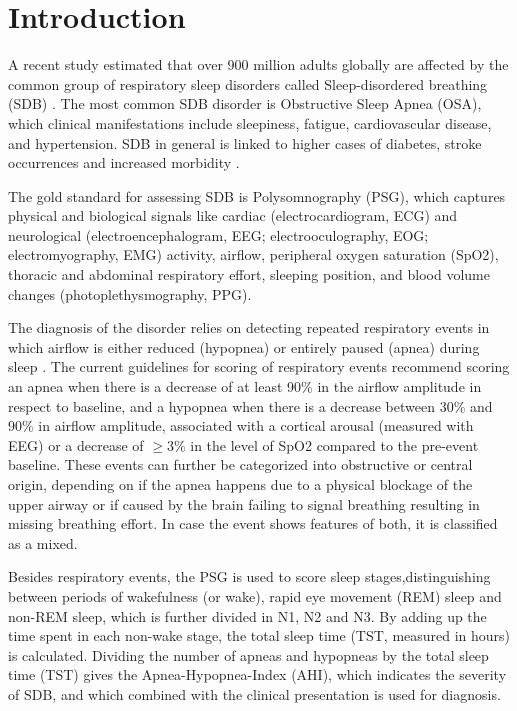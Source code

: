 \chapter{Introduction \label{Chapter-Intro}}

A recent study estimated that over 900 million adults globally are affected by the common group of respiratory sleep disorders called Sleep-disordered breathing (SDB) \cite{benjafield2019estimation}. The most common SDB disorder is Obstructive Sleep Apnea (OSA), which clinical manifestations include sleepiness, fatigue, cardiovascular disease, and hypertension. SDB in general is linked to higher cases of diabetes, stroke occurrences and increased morbidity \cite{dempsey2010dempsey,patil2007adult,young2002epidemiology}.

The gold standard for assessing SDB is Polysomnography (PSG), which captures physical and biological signals like cardiac (electrocardiogram, ECG) and neurological (electroencephalogram, EEG; electrooculography, EOG; electromyography, EMG) activity, airflow, peripheral oxygen saturation (SpO2), thoracic and abdominal respiratory effort, sleeping position, and blood volume changes (photoplethysmography, PPG).

The diagnosis of the disorder relies on detecting repeated respiratory events in which airflow is either reduced (hypopnea) or entirely paused (apnea) during sleep \cite{dempsey2010dempsey,gould2012sleep}.
The current guidelines for scoring of respiratory events \cite{troester2023aasm} recommend scoring an apnea when there is a decrease of at least 90\% in the airflow amplitude in respect to baseline, and a hypopnea when there is a decrease between 30\% and 90\% in airflow amplitude, associated with a cortical arousal (measured with EEG) or a decrease of $\geq 3\%$ in the level of SpO2 compared to the pre-event baseline.
These events can further be categorized into obstructive or central origin, depending on if the apnea happens due to a physical blockage of the upper airway or if caused by the brain failing to signal breathing resulting in missing breathing effort. In case the event shows features of both, it is classified as a mixed.

Besides respiratory events, the PSG is used to score sleep stages,distinguishing between periods of wakefulness (or wake), rapid eye movement (REM) sleep and non-REM sleep, which is further divided in N1, N2 and N3. By adding up the time spent in each non-wake stage, the total sleep time (TST, measured in hours) is calculated. Dividing the number of apneas and hypopneas by the total sleep time (TST) gives the Apnea-Hypopnea-Index (AHI), which indicates the severity of SDB, and which combined with the clinical presentation is used for diagnosis.

